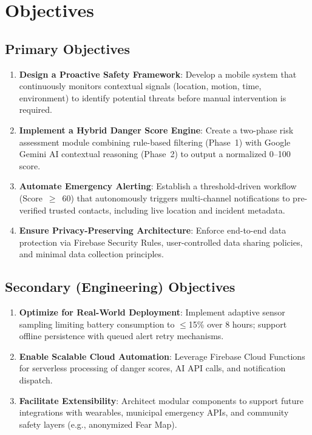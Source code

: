 \section{Objectives}

\subsection{Primary Objectives}
\begin{enumerate}[leftmargin=*]
  \item \textbf{Design a Proactive Safety Framework}: Develop a mobile system that continuously monitors contextual signals (location, motion, time, environment) to identify potential threats before manual intervention is required.
  \item \textbf{Implement a Hybrid Danger Score Engine}: Create a two-phase risk assessment module combining rule-based filtering (Phase~1) with Google Gemini AI contextual reasoning (Phase~2) to output a normalized 0--100 score.
  \item \textbf{Automate Emergency Alerting}: Establish a threshold-driven workflow (Score~$\geq$~60) that autonomously triggers multi-channel notifications to pre-verified trusted contacts, including live location and incident metadata.
  \item \textbf{Ensure Privacy-Preserving Architecture}: Enforce end-to-end data protection via Firebase Security Rules, user-controlled data sharing policies, and minimal data collection principles.
\end{enumerate}

\subsection{Secondary (Engineering) Objectives}
\begin{enumerate}[leftmargin=*,start=5]
  \item \textbf{Optimize for Real-World Deployment}: Implement adaptive sensor sampling limiting battery consumption to $\leq$15\% over 8 hours; support offline persistence with queued alert retry mechanisms.
  \item \textbf{Enable Scalable Cloud Automation}: Leverage Firebase Cloud Functions for serverless processing of danger scores, AI API calls, and notification dispatch.
  \item \textbf{Facilitate Extensibility}: Architect modular components to support future integrations with wearables, municipal emergency APIs, and community safety layers (e.g., anonymized Fear Map).
\end{enumerate}
